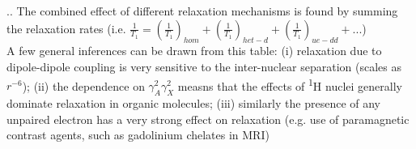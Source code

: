 \documentclass{beamer}
\begin{document}
\begin{frame}{\thesection.\thesubsection. \insertsubsection}
   The combined effect of different relaxation mechanisms is found by summing the relaxation rates (i.e. $\frac{1}{T_1} = (\frac{1}{T_1})_{hom} + (\frac{1}{T_1})_{het-d} + (\frac{1}{T_1})_{ue-dd} + ...$)\\
   A few general inferences can be drawn from this table: (i) relaxation due to dipole-dipole coupling is very sensitive to the inter-nuclear separation (scales as $r^{-6}$); (ii) the dependence on $\gamma_A^2 \gamma_X^2$ measns that the effects of \textsuperscript{1}H nuclei generally dominate relaxation in organic molecules; (iii) similarly the presence of any unpaired electron has a very strong effect on relaxation (e.g. use of paramagnetic contrast agents, such as gadolinium chelates in MRI)
\end{frame}
\end{document}
